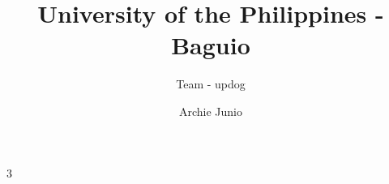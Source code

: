 \documentclass[10pt,a4paper,landscape,oneside]{amsart}
\title{University of the Philippines - Baguio}
\subtitle{Team - updog}
\date{\ddmmyyyydate{\today{}}}
\author{Archie Junio}
\begin{document}
\begin{multicols*}{3}
\maketitle
\thispagestyle{fancy}
\vspace{-3em}
\tableofcontents














% 
% 

\clearpage

\end{multicols*}
\end{document}
